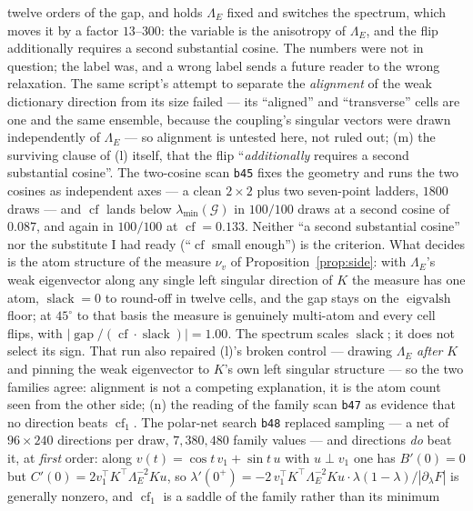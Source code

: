 \documentclass[11pt]{article}
\theoremstyle{remark}
\newcommand{\Gr}{\mathcal{G}}
\newcommand{\Le}{\Lambda_E}
\begin{document}
\begin{enumerate}
twelve orders of the gap, and holds $\Le$ fixed and switches the spectrum, which moves it by a factor
$13$--$300$: the variable is the anisotropy of $\Le$, and the flip additionally requires a second
substantial cosine. The numbers were not in question; the label was, and a wrong label sends a future
reader to the wrong relaxation. The same script's attempt to separate the \emph{alignment} of the weak
dictionary direction from its size failed --- its ``aligned'' and ``transverse'' cells are one and the
same ensemble, because the coupling's singular vectors were drawn independently of $\Le$ --- so
alignment is untested here, not ruled out;
(m) the surviving clause of (l) itself, that the flip ``\emph{additionally} requires a second
substantial cosine''. The two-cosine scan \texttt{b45} fixes the geometry and runs the two cosines as independent axes ---
a clean $2\times2$ plus two seven-point ladders, $1800$ draws --- and $\operatorname{cf}$ lands below
$\lambda_{\min}(\Gr)$ in $100/100$ draws at a second cosine of $0.087$, and again in $100/100$ at
$\operatorname{cf}=0.133$. Neither ``a second substantial cosine'' nor the substitute I had ready
(``$\operatorname{cf}$ small enough'') is the criterion. What decides is the atom structure of the
measure $\nu_v$ of Proposition~\ref{prop:side}: with $\Le$'s weak eigenvector along any single left
singular direction of $K$ the measure has one atom, $\operatorname{slack}=0$ to round-off in twelve
cells, and the gap stays on the $\operatorname{eigvalsh}$ floor; at $45^\circ$ to that basis the
measure is genuinely multi-atom and every cell flips, with
$|\operatorname{gap}/(\operatorname{cf}\cdot\operatorname{slack})|=1.00$. The spectrum scales
$\operatorname{slack}$; it does not select its sign. That run also repaired (l)'s broken control ---
drawing $\Le$ \emph{after} $K$ and pinning the weak eigenvector to $K$'s own left singular structure
--- so the two families agree: alignment is not a competing explanation, it is the atom count seen
from the other side;
(n) the reading of the family scan \texttt{b47} as evidence that no direction beats
$\operatorname{cf}_{1}$. The polar-net search \texttt{b48} replaced sampling --- a net of $96\times240$
directions per draw, $7{,}380{,}480$ family values --- and directions \emph{do} beat it, at
\emph{first} order: along $v(t)=\cos t\,v_{1}+\sin t\,u$ with $u\perp v_{1}$ one has
$B'(0)=0$ but $C'(0)=2v_{1}^{\top}K^{\top}\Le^{-2}Ku$, so
$\lambda'(0^{+})=-2\,v_{1}^{\top}K^{\top}\Le^{-2}Ku\cdot\lambda(1-\lambda)/|\partial_\lambda F|$ is
generally nonzero, and $\operatorname{cf}_{1}$ is a saddle of the family rather than its minimum

\end{enumerate}
\end{document}
